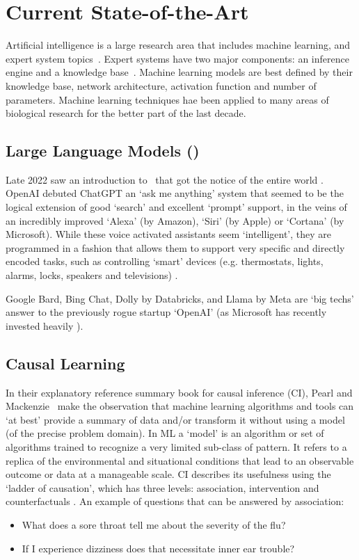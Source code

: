 \section{Current State-of-the-Art}

Artificial intelligence is a large research area that includes machine learning, and expert system topics~\cite{RussellNorvig:2016}.
Expert systems have two major components: an inference engine and a knowledge base~\cite{Liao:2005,Tan:2017}.
Machine learning models are best defined by their knowledge base, network architecture, activation function and number of parameters.
Machine learning techniques hae been applied to many areas of biological research \cite{Deng:2011,Angermueller:2016,Gawehn:2016_deep,Min:2017,Miotto:2018:deep,Tran:2018,Toh:2019,Zhang:2019,Bouwmeester:2020,Wen:2020:deep,Caudai:2021,Talukder:2021,Hassabis:2022} for the better part of the last decade.

\subsection{Large Language Models (\llms)}
Late 2022 saw an introduction to \llms\ that got the notice of the entire world \cite{Schulman:2022_chatgptintro}.
OpenAI debuted ChatGPT an `ask me anything' system that seemed to be the logical extension of good `search' and excellent `prompt' support, in the veins of an incredibly improved `Alexa' (by Amazon), `Siri' (by Apple) or `Cortana' (by Microsoft).
While these voice activated assistants seem `intelligent', they are programmed in a fashion that allows them to support very specific and directly encoded tasks, such as controlling `smart' devices (e.g. thermostats, lights, alarms, locks, speakers and televisions) \cite{Hoy:2018}.

Google Bard, Bing Chat, Dolly by Databricks, and Llama by Meta are `big techs' answer to the previously rogue startup `OpenAI' (as Microsoft has recently invested heavily \cite{Browne:2023} ).

\subsection{Causal Learning}
In their explanatory reference summary book for causal inference (CI), Pearl and Mackenzie~\cite{Pearl:2018} make the observation that machine learning algorithms and tools can `at best' provide a summary of data and/or transform it without using a model (of the precise problem domain).
In ML a `model' is an algorithm or set of algorithms trained to recognize a very limited sub-class of pattern.
It refers to a replica of the environmental and situational conditions that lead to an observable outcome or data at a manageable scale.
CI describes its usefulness using the `ladder of causation', which has three levels: association, intervention and counterfactuals \cite{Pearl:2018}.
An example of questions that can be answered by association:
\begin{itemize}
    \item What does a sore throat tell me about the severity of the flu?
    \item If I experience dizziness does that necessitate inner ear trouble?
\end{itemize}

